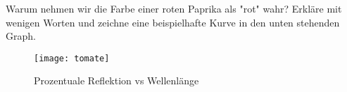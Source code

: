\documentclass[../../main.tex]{subfiles}
\begin{document}
Warum nehmen wir die Farbe einer roten Paprika als "rot" wahr? Erkläre mit wenigen Worten und zeichne eine beispielhafte Kurve in den unten stehenden Graph.

\begin{figure}[h]
    \centering
    \texttt{[image: tomate]}
    \caption{Prozentuale Reflektion vs Wellenlänge}
    \label{fig:tomate}
\end{figure}
\end{document}
